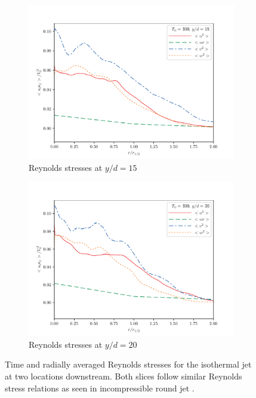 \begin{figure}[H]
\begin{center}
\begin{subfigure}{0.45\textwidth}
	\includegraphics[scale=.45]{figures/Plots/radial/slices_5/same_ambient/Rey_Stress_0_15.pdf}
	\caption{Reynolds stresses at $y/d=15$} \label{330_rey_15}
\end{subfigure}
\begin{subfigure}{0.45\textwidth}
	\includegraphics[scale=.45]{figures/Plots/radial/slices_5/same_ambient/Rey_Stress_0_2.pdf}
	\caption{Reynolds stresses at $y/d=20$} \label{330_rey_20}
\end{subfigure}
\caption{Time and radially averaged Reynolds stresses for the isothermal jet at two locations downstream. Both slices follow similar Reynolds stress relations as seen in incompressible round jet \cite{Pope}.}
\label{330_reynolds_features}
\end{center}
\end{figure}

